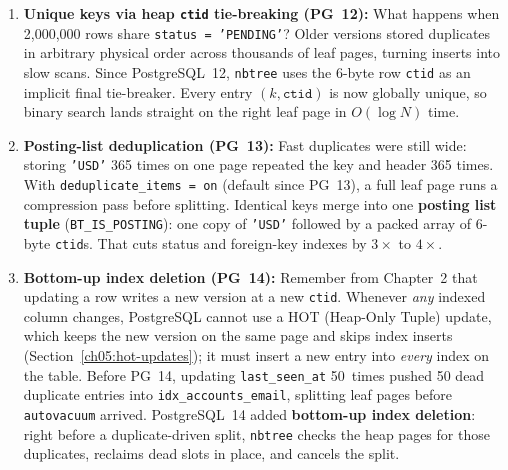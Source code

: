 \begin{enumerate}
  \item \textbf{Unique keys via heap \texttt{ctid} tie-breaking (PG~12):} What happens when 2,000,000 rows share \texttt{status = 'PENDING'}? Older versions stored duplicates in arbitrary physical order across thousands of leaf pages, turning inserts into slow scans. Since PostgreSQL~12, \texttt{nbtree} uses the 6-byte row \texttt{ctid} as an implicit final tie-breaker. Every entry $(k, \texttt{ctid})$ is now globally unique, so binary search lands straight on the right leaf page in $O(\log N)$ time.
  \item \textbf{Posting-list deduplication (PG~13):} Fast duplicates were still wide: storing \texttt{'USD'} 365 times on one page repeated the key and header 365 times. With \texttt{deduplicate\_items = on} (default since PG~13), a full leaf page runs a compression pass before splitting. Identical keys merge into one \textbf{posting list tuple} (\texttt{BT\_IS\_POSTING}): one copy of \texttt{'USD'} followed by a packed array of 6-byte \texttt{ctid}s. That cuts status and foreign-key indexes by $3\times$ to $4\times$.
  \item \textbf{Bottom-up index deletion (PG~14):} Remember from Chapter~2 that updating a row writes a new version at a new \texttt{ctid}. Whenever \emph{any} indexed column changes, PostgreSQL cannot use a HOT (Heap-Only Tuple) update, which keeps the new version on the same page and skips index inserts (Section~\ref{ch05:hot-updates}); it must insert a new entry into \emph{every} index on the table. Before PG~14, updating \texttt{last\_seen\_at} 50~times pushed 50 dead duplicate entries into \texttt{idx\_accounts\_email}, splitting leaf pages before \texttt{autovacuum} arrived. PostgreSQL~14 added \textbf{bottom-up index deletion}: right before a duplicate-driven split, \texttt{nbtree} checks the heap pages for those duplicates, reclaims dead slots in place, and cancels the split.
\end{enumerate}

